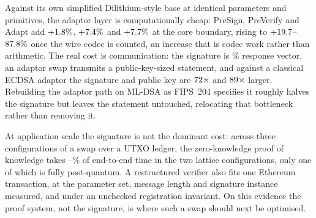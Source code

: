 Against its own simplified Dilithium-style base at identical parameters and primitives,
the adaptor layer is computationally cheap: PreSign, PreVerify and Adapt add
$+1.8\%$, $+7.4\%$ and $+7.7\%$ at the core boundary,
rising to $+19.7$--$87.8\%$ once the wire codec is counted, an
increase that is codec work rather than arithmetic. The real cost is communication: the
signature is \zPctTarget\% response vector, an adaptor swap transmits a public-key-sized
statement, and against a classical ECDSA adaptor the signature and public key are
$72\times$ and $89\times$ larger. Rebuilding the adaptor path on ML-DSA
as FIPS~204 specifies it roughly halves the signature but leaves the statement untouched,
relocating that bottleneck rather than removing it.

At application scale the signature is not the dominant cost: across three
configurations of a swap over a UTXO ledger, the zero-knowledge proof of knowledge takes
\cfgThreeProofPct--\cfgTwoProofPct\% of end-to-end time in the two lattice configurations,
only one of which is fully post-quantum. A restructured verifier also fits one Ethereum
transaction, at the parameter set, message length and signature instance measured, and
under an unchecked registration invariant. On this evidence the proof system, not the
signature, is where such a swap should next be optimised.
